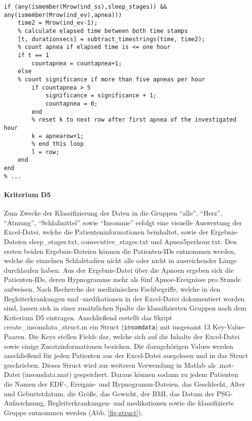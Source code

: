 \begin{lstlisting}[caption={Implementierung Kriterium D4 in Skript check\_apneas5.m}, label={lst:D4apnea5}]
% ...
if (any(ismember(Mrow(ind_ss),sleep_stages)) && any(ismember(Mrow(ind_ev),apnea)))
    time2 = Mrow(ind_ev-1);
    % calculate elapsed time between both time stamps
    [t, durationsecs] = subtract_timestrings(time, time2);
    % count apnea if elapsed time is <= one hour
    if t == 1
        countapnea = countapnea+1;
    else
    % count significance if more than five apneas per hour
        if countapnea > 5
            significance = significance + 1;
            countapnea = 0;
        end
        % reset k to next row after first apnea of the investigated hour
        k = apnearow+1;
        % end this loop
        l = row;
    end
end
% ...
\end{lstlisting}

\paragraph{Kriterium D5} Zum Zwecke der Klassifizierung der Daten in die Gruppen "`alle"', "`Herz"', "`Atmung"', "`Schlafmittel"' sowie "`Insomnie"' erfolgt eine visuelle Auswertung der Excel-Datei, welche die Patienteninformationen beinhaltet, sowie der Ergebnis-Dateien sleep\_stages.txt, consecutive\_stages.txt und Apnea5perhour.txt. Den ersten beiden Ergebnis-Dateien können die Patienten-IDs entnommen werden, welche die einzelnen Schlafstadien nicht alle oder nicht in ausreichender Länge durchlaufen haben. Aus der Ergebnis-Datei über die Apnoen ergeben sich die Patienten-IDs, deren Hypnogramme mehr als fünf Apnoe-Ereignisse pro Stunde aufweisen. Nach Recherche der medizinischen Fachbegriffe, welche in den Begleiterkrankungen und -medikationen in der Excel-Datei dokumentiert worden sind, lassen sich in einer zusätzlichen Spalte die klassifizierten Gruppen nach dem Kriterium D5 eintragen. Anschließend erstellt das Skript create\_insomdata\_struct.m ein Struct (\texttt{insomdata}) mit insgesamt 13 Key-Value-Paaren. Die Keys stellen Fields dar, welche sich auf die Inhalte der Excel-Datei sowie einige Zusatzinformationen beziehen. Die dazugehörigen Values werden anschließend für jeden Patienten aus der Excel-Datei ausgelesen und in das Struct geschrieben. Dieses Struct wird zur weiteren Verwendung in Matlab als .mat-Datei (insomdata.mat) gespeichert. Daraus können sodann zu jedem Patienten die Namen der \acs{EDF}-, Ereignis- und Hypnogramm-Dateien, das Geschlecht, Alter und Geburtstdatum, die Größe, das Gewicht, der \acs{BMI}, das Datum der \acs{PSG}-Aufzeichnung, Begleiterkrankungen- und medikationen sowie die klassifizierte Gruppe entnommen werden (Abb. \ref{fig:struct}). 

